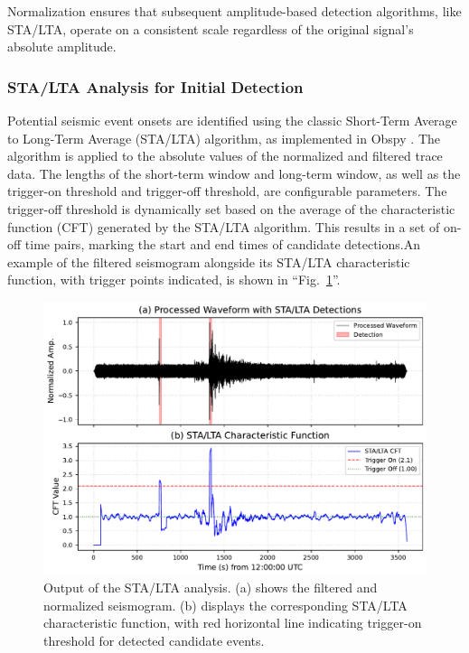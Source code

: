 \documentclass[conference]{IEEEtran}
\begin{document}
            Normalization ensures that subsequent amplitude-based detection algorithms, like STA/LTA, operate on a
            consistent scale regardless of the original signal's absolute amplitude.
                
        \subsubsection{STA\slash LTA Analysis for Initial Detection}
            Potential seismic event onsets are identified using the classic Short-Term Average to Long-Term Average
            (STA/LTA) algorithm, as implemented in Obspy \cite{Beyreuther2010}. The algorithm is applied to the absolute
            values of the normalized and filtered trace data. The lengths of the short-term window and long-term window,
            as well as the trigger-on threshold and trigger-off threshold, are configurable parameters. The trigger-off
            threshold is dynamically set based on the average of the characteristic function (CFT) generated by the
            STA/LTA algorithm. This results in a set of on-off time pairs, marking the start and end times of candidate
            detections.An example of the filtered seismogram alongside its STA/LTA characteristic function, with trigger
            points indicated, is shown in ``Fig.~\ref{fig:stalta_output}''.
            \begin{figure}[htbp]
                \centerline{\includegraphics[width=0.9\columnwidth]{figures/fig4_stalta_detections.pdf}}
                \caption{Output of the STA/LTA analysis. (a) shows the filtered and normalized seismogram. 
                (b) displays the corresponding STA/LTA characteristic function, with red horizontal 
                line indicating trigger-on threshold for detected candidate events.}
                \label{fig:stalta_output}
            \end{figure}
\end{document}

